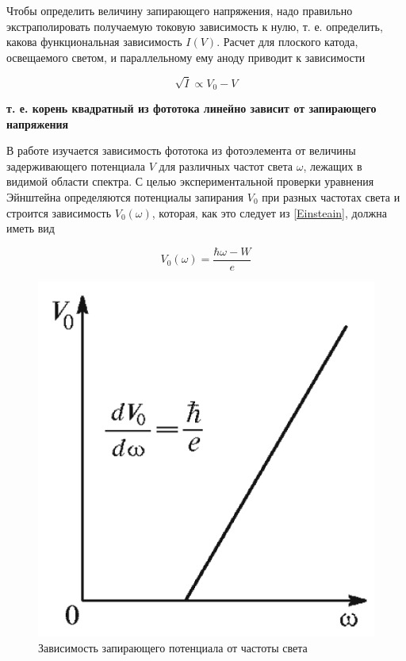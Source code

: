 \documentclass[a4paper,12pt]{article}
\begin{document}
Чтобы определить величину запирающего напряжения, надо правильно экстраполировать получаемую токовую зависимость к нулю, т. е. определить, какова функциональная зависимость $ I(V) $. Расчет для плоского катода, освещаемого светом, и параллельному ему аноду приводит к зависимости
	
\begin{equation}
\sqrt{I} \propto V_0 - V
\label{sqrt I = V}
\end{equation}
	
\textbf{т. е. корень квадратный из фототока линейно зависит от запирающего напряжения}

	В работе изучается зависимость фототока из фотоэлемента от величины задерживающего потенциала $ V $ для различных частот света $ \omega $, лежащих в видимой области спектра. С целью экспериментальной проверки уравнения Эйнштейна определяются потенциалы запирания $ V_0 $ при разных частотах света и строится зависимость $ V_0(\omega) $, которая, как это следует из \eqref{Einsteain}, должна иметь вид
	
\begin{equation}
V_0 (\omega) = \dfrac{\hbar\omega - W}{e}
\label{V(w)}
\end{equation}
	
\begin{figure}[h!]
\centering
\includegraphics[scale=0.3]{V(w)}
\caption{Зависимость запирающего потенциала
от частоты света}
\label{ris V(w)}
\end{figure}
	
\end{document}
